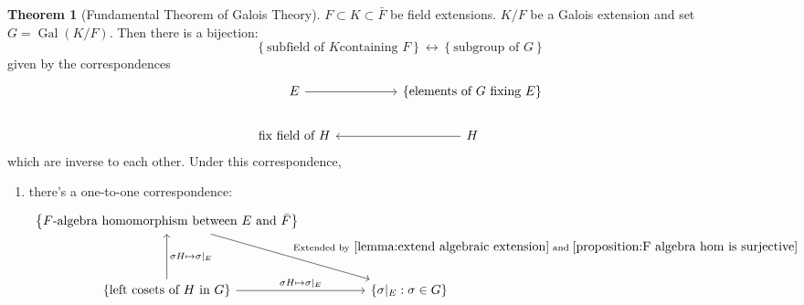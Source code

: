 \documentclass[a4paper,12pt]{article}
\newcommand{\bbrace}[1]{\left\{ #1 \right\} }
\theoremstyle{definition}
\newtheorem{theo}[defn]{Theorem}
\begin{document}
\begin{theo}[Fundamental Theorem of Galois Theory]
    $F\subset K\subset \bar{F}$ be field extensions. $K / F$ be a Galois extension and set $G=\operatorname{Gal}(K / F)$. Then there is a bijection:
    \begin{equation*}
        \bbrace{\text{subfield of }K \text{containing } F }\longleftrightarrow \bbrace{\text{subgroup of } G }
    \end{equation*}
    given by the correspondences
    \[\begin{tikzcd}
            E && {\left\{\text{elements of } G \text{ fixing } E  \right\}} \\
            {\text{fix field of } H} && H
            \arrow[from=1-1, to=1-3]
            \arrow[from=2-3, to=2-1]
        \end{tikzcd}\]
    which are inverse to each other. Under this correspondence,
    \begin{enumerate}[(1)]
        \item there's a one-to-one correspondence:
              \[\begin{tikzcd}
                      {\bbrace{ F\text{-algebra homomorphism between } E \text{ and } \bar{F}  }} \\
                      \\
                      {\left\{\text{left cosets of } H \text{ in } G\right\}} && {\left\{  \sigma|_E:\sigma\in G   \right\}}
                      \arrow["{\sigma H\mapsto \sigma|_E}"', from=3-1, to=1-1]
                      \arrow["{\sigma H\mapsto \sigma|_E}", from=3-1, to=3-3]
                      \arrow["{\text{Extended by}~\ref{lemma:extend algebraic extension}\text{ and }\ref{proposition:F algebra hom is surjective}}", from=1-1, to=3-3]
                  \end{tikzcd}\]

\end{enumerate}
\end{theo}
\end{document}

